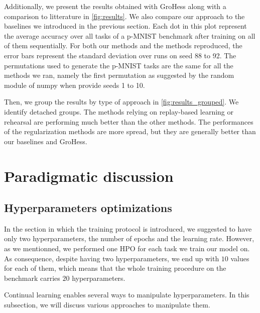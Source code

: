 \documentclass[11pt]{article}
\begin{document}
Additionally, we present the results obtained with GroHess along with a comparison to litterature in \ref{fig:results}. We also compare our approach to the baselines we introduced in the previous section. Each dot in this plot represent the average accuracy over all tasks of a p-MNIST benchmark after training on all of them sequentially. For both our methods and the methods reproduced, the error bars represent the standard deviation over runs on seed 88 to 92. The permutations used to generate the p-MNIST tasks are the same for all the methods we ran, namely the first permutation as suggested by the random module of numpy when provide seeds 1 to 10.

\vspace{2mm}
\noindent
Then, we group the results by type of approach in \ref{fig:results_grouped}. We identify detached groups. The methods relying on replay-based learning or rehearsal are performing much better than the other methods. The performances of the regularization methods are more spread, but they are generally better than our baselines and GroHess.



\section{Paradigmatic discussion}



\subsection{Hyperparameters optimizations}


In the section in which the training protocol is introduced, we suggested to have only two hyperparameters, the number of epochs and the learning rate. However, as we mentionned, we performed one HPO for each task we train our model on. As consequence, despite having two hyperparameters, we end up with $10$ values for each of them, which means that the whole training procedure on the benchmark carries $20$ hyperparameters. 

\vspace{2mm}
\noindent
Continual learning enables several ways to manipulate hyperparameters. In this subsection, we will discuss various approaches to manipulate them. 
\end{document}
